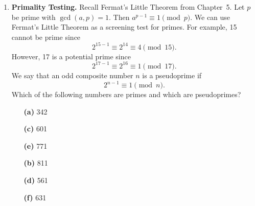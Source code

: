 {\begin{enumerate}
\begin{enumerate}
{}
 
\vspace{1ex}
 
The expression  $\lceil \sqrt{n}\, \rceil$ means the smallest integer
greater than or equal to the square root of $n$. Write another program
to do factorization using trial division and compare the speed of the
two algorithms. Which algorithm is faster and why?
 
 
 
 
\end{enumerate}
 
 
\bf\item\rm
{\bf Primality Testing.}
Recall Fermat's Little Theorem from Chapter~5. Let $p$ be prime with
$\gcd(a, p) = 1$. Then $a^{p-1} \equiv 1 \pmod{p}$.  We can use
Fermat's Little Theorem as a screening test for primes. For example, 15
cannot be prime since
$$
2^{15-1} \equiv 2^{14} \equiv 4 \pmod{15}.
$$
However, 17 is a potential prime since
$$
2^{17-1} \equiv 2^{16} \equiv 1 \pmod{17}.
$$
We say that an odd composite number $n$ is a {\bfi
pseudoprime\/} if 
$$
2^{n-1} \equiv 1 \pmod{n}.
$$
Which of the following numbers are primes  and which are pseudoprimes?
 
 
\vspace{3pt}        %
 
\hspace{-7pt}
\begin{minipage}[t]{4.6in}
\noindent
\begin{minipage}[t]{2.25in}
\begin{itemize}
 
 \item[{\bf (a)}]
342
 
 \item[{\bf (c)}]
601
 
 \item[{\bf (e)}]
771
 
\end{itemize}
\end{minipage} \hfill
\begin{minipage}[t]{2.25in}
\begin{itemize}
 
 \item[{\bf (b)}]
811
 
 \item[{\bf (d)}]
561
 
 \item[{\bf (f)}]
631
 
\end{itemize}
\end{minipage}
\end{minipage}
 

\end{enumerate}}
